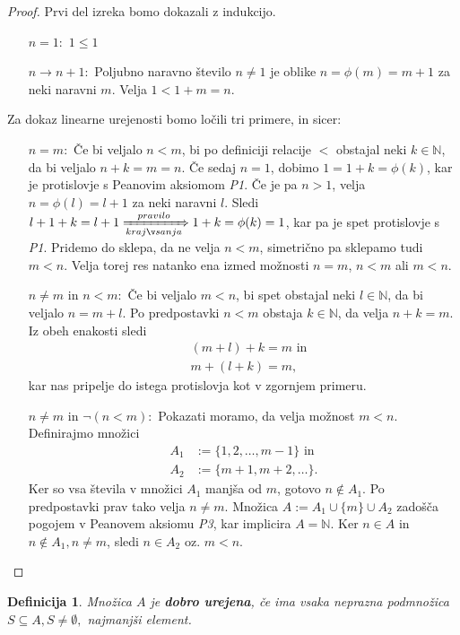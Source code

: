 \documentclass[12pt, a4paper]{article}
\newtheorem{defi}{Definicija}
\begin{document}
\begin{proof}
Prvi del izreka bomo dokazali z indukcijo.
\begin{itemize}
\item[$n=1:$] $1\leq 1$ \checkmark
\item[$n\rightarrow n+1:$] Poljubno naravno število $n\neq1$ je oblike $n=\phi(m)=m+1$ za neki naravni $m$. Velja $1<1+m=n$. \checkmark
\end{itemize}
Za dokaz linearne urejenosti bomo ločili tri primere, in sicer:
\begin{itemize}
\item[$n=m:$] Če bi veljalo $n<m$, bi po definiciji relacije $<$ obstajal neki $k\in \mathbb{N}$, da bi veljalo $n+k=m=n$. Če sedaj $n=1$, dobimo $1=1+k=\phi(k)$, kar je protislovje s Peanovim aksiomom \textit{P1}. Če  je pa $n>1$, velja $n=\phi(l)=l+1$ za neki naravni $l$. Sledi $l+1+k=l+1\xRightarrow[krajšanja]{pravilo} 1+k=\phi(k)=1$, kar pa je spet protislovje s \textit{P1}. Pridemo do sklepa, da ne velja $n<m$, simetrično pa sklepamo tudi $m<n$. Velja torej res natanko ena izmed možnosti $n=m$, $n < m$ ali $m<n$.
\item[$n\neq m$ in $n<m:$] Če bi veljalo $m<n$, bi spet obstajal neki $l\in\mathbb{N}$, da bi veljalo $n=m+l$. Po predpostavki $n<m$ obstaja $k\in\mathbb{N}$, da velja $n+k=m$. Iz obeh enakosti sledi
\begin{align*}
&(m+l)+k=m\text{ in} \\
&m+(l+k)=m,
\end{align*}
kar nas pripelje do istega protislovja kot v zgornjem primeru.
\item[$n\neq m$ in $\neg (n<m):$] Pokazati moramo, da velja možnost $m<n$. Definirajmo množici
\begin{align*}
A_{1}&:=\{1,2,\dots,m-1\}\text{ in}\\
A_{2}&:=\{m+1,m+2,\dots\}.
\end{align*}
Ker so vsa števila v množici $A_{1}$ manjša od $m$, gotovo $n\notin A_{1}$. Po predpostavki prav tako velja $n\neq m$. Množica $A:= A_{1} \cup \{m\} \cup A_{2}$ zadošča pogojem v Peanovem aksiomu \textit{P3}, kar implicira $A=\mathbb{N}$. Ker $n\in A$ in $n\notin A_{1}, n \neq m$, sledi $n\in A_{2}$ oz. $m<n$.
\end{itemize}
\end{proof}

\begin{defi}
Množica $A$ je \textbf{dobro urejena}, če ima vsaka neprazna podmnožica $S \subseteq A, S\neq \emptyset,$ najmanjši element.
\end{defi}
\end{document}
